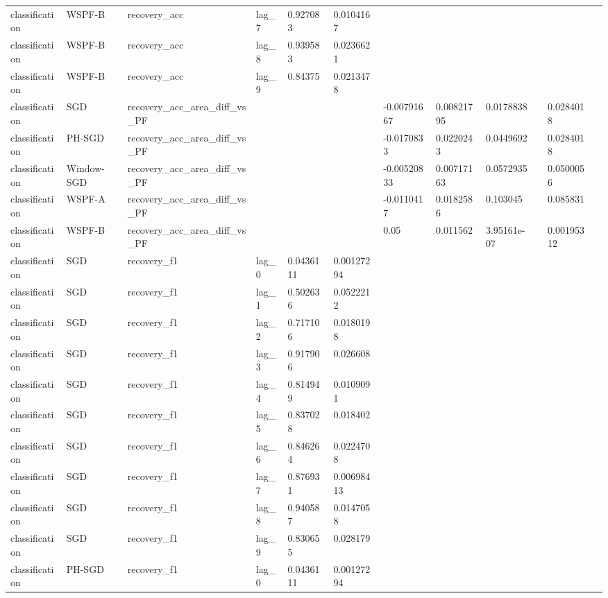 \begin{tabular}{llllllllllll}
classification & WSPF-B & recovery\_acc & lag\_7 & 0.927083 & 0.0104167 &  &  &  &  &  &  \\
classification & WSPF-B & recovery\_acc & lag\_8 & 0.939583 & 0.0236621 &  &  &  &  &  &  \\
classification & WSPF-B & recovery\_acc & lag\_9 & 0.84375 & 0.0213478 &  &  &  &  &  &  \\
classification & SGD & recovery\_acc\_area\_diff\_vs\_PF &  &  &  & -0.00791667 & 0.00821795 & 0.0178838 &  & 0.0284018 &  \\
classification & PH-SGD & recovery\_acc\_area\_diff\_vs\_PF &  &  &  & -0.0170833 & 0.0220243 & 0.0449692 &  & 0.0284018 &  \\
classification & Window-SGD & recovery\_acc\_area\_diff\_vs\_PF &  &  &  & -0.00520833 & 0.00717163 & 0.0572935 &  & 0.0500056 &  \\
classification & WSPF-A & recovery\_acc\_area\_diff\_vs\_PF &  &  &  & -0.0110417 & 0.0182586 & 0.103045 &  & 0.085831 &  \\
classification & WSPF-B & recovery\_acc\_area\_diff\_vs\_PF &  &  &  & 0.05 & 0.011562 & 3.95161e-07 &  & 0.00195312 &  \\
classification & SGD & recovery\_f1 & lag\_0 & 0.0436111 & 0.00127294 &  &  &  &  &  &  \\
classification & SGD & recovery\_f1 & lag\_1 & 0.502636 & 0.0522212 &  &  &  &  &  &  \\
classification & SGD & recovery\_f1 & lag\_2 & 0.717106 & 0.0180198 &  &  &  &  &  &  \\
classification & SGD & recovery\_f1 & lag\_3 & 0.917906 & 0.026608 &  &  &  &  &  &  \\
classification & SGD & recovery\_f1 & lag\_4 & 0.814949 & 0.0109091 &  &  &  &  &  &  \\
classification & SGD & recovery\_f1 & lag\_5 & 0.837028 & 0.018402 &  &  &  &  &  &  \\
classification & SGD & recovery\_f1 & lag\_6 & 0.846264 & 0.0224708 &  &  &  &  &  &  \\
classification & SGD & recovery\_f1 & lag\_7 & 0.876931 & 0.00698413 &  &  &  &  &  &  \\
classification & SGD & recovery\_f1 & lag\_8 & 0.940587 & 0.0147058 &  &  &  &  &  &  \\
classification & SGD & recovery\_f1 & lag\_9 & 0.830655 & 0.028179 &  &  &  &  &  &  \\
classification & PH-SGD & recovery\_f1 & lag\_0 & 0.0436111 & 0.00127294 &  &  &  &  &  &  \\

\end{tabular}
